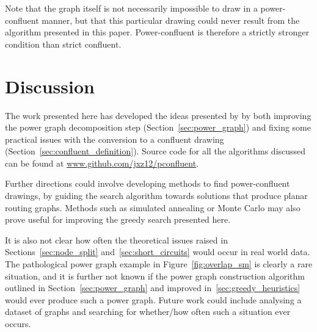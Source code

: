 Note that the graph itself is not necessarily impossible to draw in a power-confluent manner, but that this particular drawing could never result from the algorithm presented in this paper.
Power-confluent is therefore a strictly stronger condition than strict confluent.

\section{Discussion}
\label{sec:power_discussion}
The work presented here has developed the ideas presented by \citet{Bach2017} by both improving the power graph decomposition step (Section~\ref{sec:power_graph}) and fixing some practical issues with the conversion to a confluent drawing (Section~\ref{sec:confluent_definition}). Source code for all the algorithms discussed can be found at \url{www.github.com/jxz12/pconfluent}.

Further directions could involve developing methods to find power-confluent drawings, by guiding the search algorithm towards solutions that produce planar routing graphs.
Methods such as simulated annealing or Monte Carlo may also prove useful for improving the greedy search presented here.

It is also not clear how often the theoretical issues raised in Sections~\ref{sec:node_split} and~\ref{sec:short_circuits} would occur in real world data. The pathological power graph example in Figure~\ref{fig:overlap_sm} is clearly a rare situation, and it is further not known if the power graph construction algorithm outlined in Section~\ref{sec:power_graph} and improved in~\ref{sec:greedy_heuristics} would ever produce such a power graph. Future work could include analysing a dataset of graphs and searching for whether/how often such a situation ever occurs.

